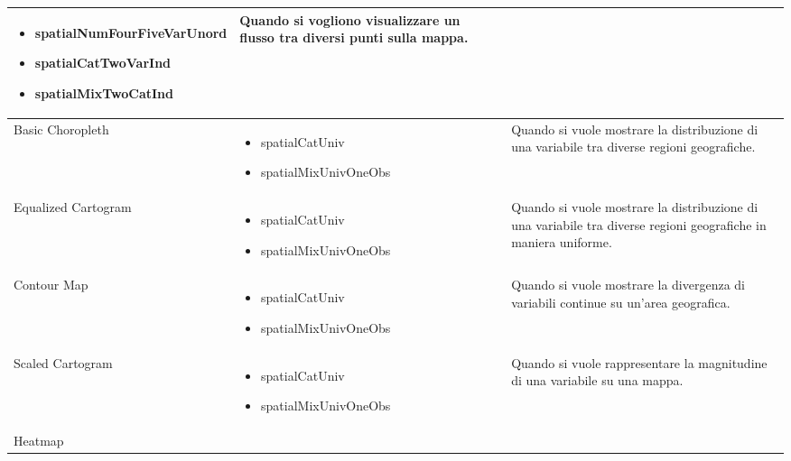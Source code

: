 \begin{xltabular}{\columnwidth}{|p{0.15\columnwidth}|X|p{0.27\columnwidth}|}
\begin{itemize}[noitemsep,topsep=0pt, left=0pt]
        \item spatialNumFourFiveVarUnord
        \item spatialCatTwoVarInd
        \item spatialMixTwoCatInd
    \end{itemize} & 
    Quando si vogliono visualizzare un flusso tra diversi punti sulla mappa. \\
    \hline
    Basic Choropleth & 
    \vspace{-3.5mm}
    \begin{itemize}[noitemsep,topsep=0pt, left=0pt]
        \item spatialCatUniv
        \item spatialMixUnivOneObs
    \end{itemize} & 
    Quando si vuole mostrare la distribuzione di una variabile tra diverse regioni geografiche. \\
    \hline
    Equalized Cartogram & 
    \vspace{-3.5mm}
    \begin{itemize}[noitemsep,topsep=0pt, left=0pt]
        \item spatialCatUniv
        \item spatialMixUnivOneObs
    \end{itemize} & 
    Quando si vuole mostrare la distribuzione di una variabile tra diverse regioni geografiche in maniera uniforme. \\
    \hline
    Contour Map & 
    \vspace{-3.5mm}
    \begin{itemize}[noitemsep,topsep=0pt, left=0pt]
        \item spatialCatUniv
        \item spatialMixUnivOneObs
    \end{itemize} & 
    Quando si vuole mostrare la divergenza di variabili continue su un'area geografica. \\
    \hline
    Scaled Cartogram & 
    \vspace{-3.5mm}
    \begin{itemize}[noitemsep,topsep=0pt, left=0pt]
        \item spatialCatUniv
        \item spatialMixUnivOneObs
    \end{itemize} & 
    Quando si vuole rappresentare la magnitudine di una variabile su una mappa. \\
    \hline
    Heatmap & 
    \vspace{-3.5mm}

\end{xltabular}
